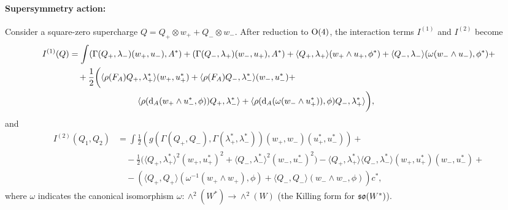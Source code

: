 \documentclass[10pt, oneside]{article}
\begin{document}
\paragraph{Supersymmetry action:} 
\begin{prop}
Consider a square-zero supercharge $Q = Q_+ \otimes w_+ + Q_- \otimes w_-$.  After reduction to $\mathrm{O}(4)$, the interaction terms $I^{(1)}$ and $I^{(2)}$ become
\begin{align*}
I^{(1)}(Q) &= \int (\Gamma(Q_+, \lambda_-)(w_+,u_-), A^*) + (\Gamma(Q_-, \lambda_+)(w_-,u_+), A^*) + \langle Q_+, \lambda_+ \rangle (w_+ \wedge u_+, \phi^*) + \langle Q_-, \lambda_- \rangle (\omega(w_- \wedge u_-), \phi^*) + \\
&\quad + \frac12 \bigg( \langle \rho(F_A)Q_+, \lambda_+^*\rangle(w_+,u_+^*) + \langle \rho(F_A)Q_-, \lambda_-^*\rangle(w_-,u_-^*) +\\
&\qquad \qquad \qquad \qquad \langle\rho({\rm d}_A (w_+ \wedge u_-^*,\phi))Q_+, \lambda_-^*\rangle + \langle\rho({\rm d}_A (\omega(w_- \wedge u_+^*)),\phi)Q_-, \lambda_+^*\rangle \bigg),
\end{align*}
and
\begin{align*}
I^{(2)}(Q_1, Q_2) &= \int \frac 12 \left( g(\Gamma(Q_+, Q_-), \Gamma(\lambda^*_+, \lambda^*_-)) (w_+, w_-) (u_+^*,u_-^*) \right) + \\
&\quad - \frac 12 \big( \langle Q_+,\lambda_+^*\rangle^2(w_+,u_+^*)^2 + \langle Q_-,\lambda_-^*\rangle^2(w_-,u_-^*)^2 \big) - \langle Q_+,\lambda_+^*\rangle \langle Q_-, \lambda_-^*\rangle (w_+,u_+^*)(w_-,u_-^*) +\\
&\quad - (\langle Q_+, Q_+ \rangle (\omega^{-1}(w_+ \wedge w_+),\phi) + \langle Q_-, Q_- \rangle (w_- \wedge w_-,\phi)  ) c^*,
\end{align*}
where $\omega$ indicates the canonical isomorphism $\omega \colon \wedge^2(W^*) \to \wedge^2(W)$ (the Killing form for $\mathfrak{so}(W^*)$).
\end{prop}
%
\end{document}
